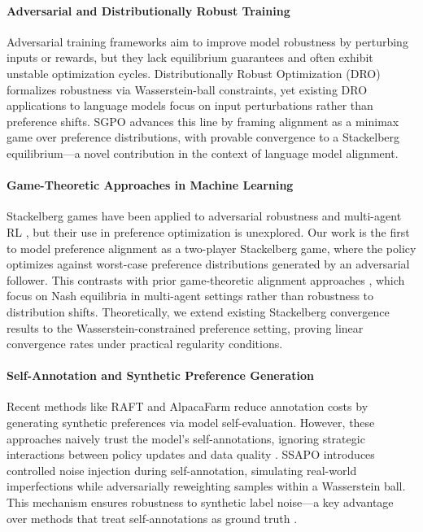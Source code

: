 \paragraph{Adversarial and Distributionally Robust Training}
Adversarial training frameworks \citep{Zhu2023FightingFI} aim to improve model robustness by perturbing inputs or rewards, but they lack equilibrium guarantees and often exhibit unstable optimization cycles. Distributionally Robust Optimization (DRO) \citep{Esfahani2018DataDrivenDR} formalizes robustness via Wasserstein-ball constraints, yet existing DRO applications to language models \citep{Pang2024TextGrad} focus on input perturbations rather than preference shifts. SGPO advances this line by framing alignment as a minimax game over preference distributions, with provable convergence to a Stackelberg equilibrium—a novel contribution in the context of language model alignment.

\paragraph{Game-Theoretic Approaches in Machine Learning}
Stackelberg games have been applied to adversarial robustness \citep{Letcher2023StablePS} and multi-agent RL \citep{Balduzzi2018RepeatedSG}, but their use in preference optimization is unexplored. Our work is the first to model preference alignment as a two-player Stackelberg game, where the policy optimizes against worst-case preference distributions generated by an adversarial follower. This contrasts with prior game-theoretic alignment approaches \citep{Tien2023GameTheoreticAM}, which focus on Nash equilibria in multi-agent settings rather than robustness to distribution shifts. Theoretically, we extend existing Stackelberg convergence results \citep{Basar1999DynamicNG} to the Wasserstein-constrained preference setting, proving linear convergence rates under practical regularity conditions.

\paragraph{Self-Annotation and Synthetic Preference Generation}
Recent methods like RAFT \citep{Dong2024Raft} and AlpacaFarm \citep{Dubois2024AlpacaFarm} reduce annotation costs by generating synthetic preferences via model self-evaluation. However, these approaches naively trust the model’s self-annotations, ignoring strategic interactions between policy updates and data quality \citep{Casper2023OpenProblems}. SSAPO introduces controlled noise injection during self-annotation, simulating real-world imperfections while adversarially reweighting samples within a Wasserstein ball. This mechanism ensures robustness to synthetic label noise—a key advantage over methods that treat self-annotations as ground truth \citep{Chen2024SelfPlay}.

